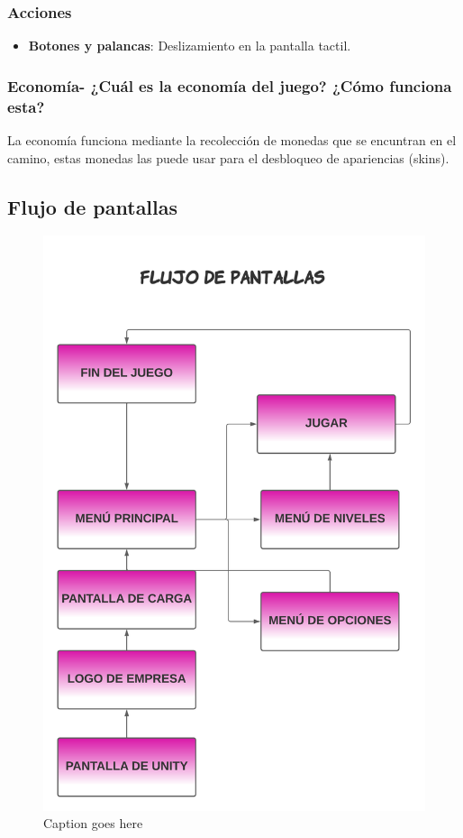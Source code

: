 \subsubsection{Acciones}
\begin{itemize}
  \item \textbf{Botones y palancas}: Deslizamiento en la pantalla tactil.
\end{itemize}

\subsubsection{Economía- ¿Cuál es la economía del juego? ¿Cómo funciona esta?}
La economía funciona mediante la recolección de monedas que se encuntran en el
camino, estas monedas las puede usar para el desbloqueo de apariencias (skins).

\subsection{ Flujo de pantallas}

\begin{figure}[!ht]
  \centering
  \includegraphics[scale = 0.7]{Figures/0. General/pantallas.png}
  \caption{Caption goes here}
  \label{fig:myfigure}
\end{figure}

